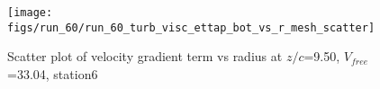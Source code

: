 \begin{figure}[H]
\centering
\texttt{[image: figs/run\_60/run\_60\_turb\_visc\_ettap\_bot\_vs\_r\_mesh\_scatter]}
\caption{Scatter plot of velocity gradient term vs radius at $z/c$=9.50, $V_{free}$=33.04, station6}
\label{fig:run_60_turb_visc_ettap_bot_vs_r_mesh_scatter}
\end{figure}


